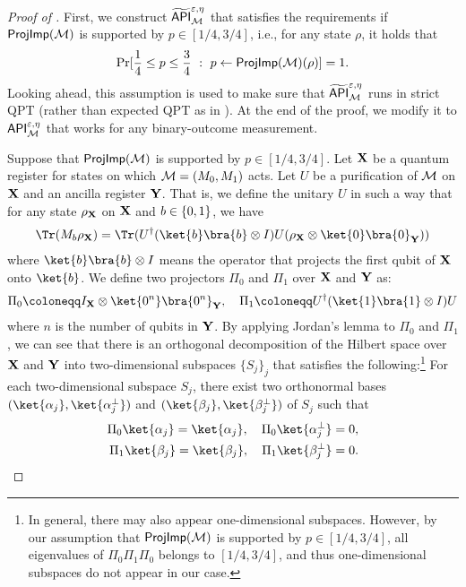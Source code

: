 \begin{proof}[Proof of ]
First, we construct $\widetilde{\mathsf{API}}_{\mathcal{M}}^{\varepsilon,\eta}$ that satisfies the requirements if $\mathsf{ProjImp}(\mathcal{M})$ is supported by $p\in [1/4,3/4]$, i.e., for any state $\rho$, it holds that 
$$\Pr[\frac{1}{4} \le p \le \frac{3}{4} ~:~p\gets \mathsf{ProjImp}(\mathcal{M})(\rho)]=1.$$ 
Looking ahead, this assumption is used to make sure that $\widetilde{\mathsf{API}}_{\mathcal{M}}^{\varepsilon,\eta}$ runs in strict QPT (rather than expected QPT as in \cite[Theorem 6.2]{TCC:Zhandry20}). 
At the end of the proof, we modify it to $\mathsf{API}_{\mathcal{M}}^{\varepsilon,\eta}$ that works for any binary-outcome measurement. 

Suppose that $\mathsf{ProjImp}(\mathcal{M})$ is supported by $p\in [1/4,3/4]$. 
Let $\mathbf{X}$ be a quantum register for states on which $\mathcal{M}=(M_0,M_1)$ acts.
Let $U$ be a purification of $\mathcal{M}$ on $\mathbf{X}$ and an ancilla register $\mathbf{Y}$. That is, we define the unitary $U$ in such a way that for any state $\rho_{\mathbf{X}}$ on $\mathbf{X}$ and $b\in \{0,1\}$, we have 
\begin{align*}
    \Tr(M_b \rho_\regX)=\Tr(U^\dagger(\ket{b}\bra{b}\otimes I) U (\rho_\regX \otimes \ket{0}\bra{0}_{\regY}))
\end{align*}
where $\ket{b}\bra{b}\otimes I$ means the operator that projects the first qubit of $\mathbf{X}$ onto $\ket{b}$. 
We define two projectors $\Pi_0$ and $\Pi_1$ over $\mathbf{X}$ and $\mathbf{Y}$ as:
\begin{align*}
\Pi_0 \coloneqq I_\regX \otimes \ket{0^n}\bra{0^n}_\regY,~~~\Pi_1 \coloneqq U^\dagger(\ket{1}\bra{1}\otimes I) U
\end{align*}
where $n$ is the number of qubits in $\mathbf{Y}$. 
By applying Jordan's lemma to $\Pi_0$ and $\Pi_1$, we can see that there is an orthogonal decomposition of the Hilbert space over $\mathbf{X}$ and $\mathbf{Y}$ into two-dimensional subspaces $\{S_j\}_j$ that satisfies the following:\footnote{In general, there may also appear one-dimensional subspaces. However, by our assumption that $\mathsf{ProjImp}(\mathcal{M})$ is supported by $p\in [1/4,3/4]$, 
all eigenvalues of $\Pi_0 \Pi_1 \Pi_0$ belongs to $[1/4,3/4]$, and thus one-dimensional subspaces do not appear in our case. 
}
For each two-dimensional subspace $S_j$, there exist two orthonormal bases $(\ket{\alpha_j},\ket{\alpha_j^{\bot}})$ and $(\ket{\beta_j},\ket{\beta_j^{\bot}})$ of $S_j$ such that 
\begin{align*}
    \Pi_0\ket{\alpha_j}=\ket{\alpha_j},~~~ \Pi_0\ket{\alpha_j^{\bot}}=0,\\
    \Pi_1\ket{\beta_j}=\ket{\beta_j},~~~ \Pi_1\ket{\beta_j^{\bot}}=0.

\end{align*}
\end{proof}
